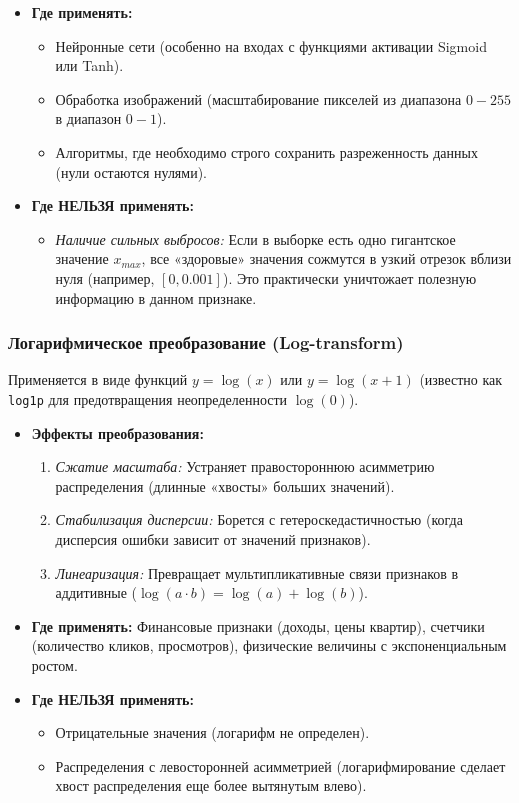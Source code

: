 \documentclass[12pt]{article}
\begin{document}
\begin{itemize}
    \item \textbf{Где применять:} 
    \begin{itemize}
        \item Нейронные сети (особенно на входах с функциями активации Sigmoid или Tanh).
        \item Обработка изображений (масштабирование пикселей из диапазона $0-255$ в диапазон $0-1$).
        \item Алгоритмы, где необходимо строго сохранить разреженность данных (нули остаются нулями).
    \end{itemize}
    \item \textbf{Где НЕЛЬЗЯ применять:}
    \begin{itemize}
        \item \textit{Наличие сильных выбросов:} Если в выборке есть одно гигантское значение $x_{max}$, все «здоровые» значения сожмутся в узкий отрезок вблизи нуля (например, $[0, 0.001]$). Это практически уничтожает полезную информацию в данном признаке.
    \end{itemize}
\end{itemize}

\subsubsection{Логарифмическое преобразование (Log-transform)}

Применяется в виде функций $y = \log(x)$ или $y = \log(x + 1)$ (известно как \texttt{log1p} для предотвращения неопределенности $\log(0)$).

\begin{itemize}
    \item \textbf{Эффекты преобразования:}
    \begin{enumerate}
        \item \textit{Сжатие масштаба:} Устраняет правостороннюю асимметрию распределения (длинные «хвосты» больших значений).
        \item \textit{Стабилизация дисперсии:} Борется с гетероскедастичностью (когда дисперсия ошибки зависит от значений признаков).
        \item \textit{Линеаризация:} Превращает мультипликативные связи признаков в аддитивные ($\log(a \cdot b) = \log(a) + \log(b)$).
    \end{enumerate}
    \item \textbf{Где применять:} Финансовые признаки (доходы, цены квартир), счетчики (количество кликов, просмотров), физические величины с экспоненциальным ростом.
    \item \textbf{Где НЕЛЬЗЯ применять:}
    \begin{itemize}
        \item Отрицательные значения (логарифм не определен).
        \item Распределения с левосторонней асимметрией (логарифмирование сделает хвост распределения еще более вытянутым влево).
    \end{itemize}
\end{itemize}
\end{document}
